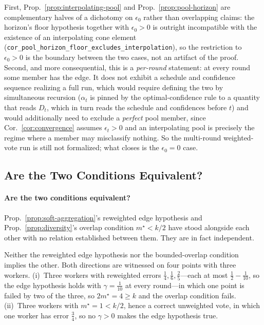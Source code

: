 First, Prop.~\ref{prop:interpolating-pool} and Prop.~\ref{prop:pool-horizon} are complementary halves of a dichotomy on $\epsilon_0$ rather than overlapping claims: the horizon's floor hypothesis together with $\epsilon_0>0$ is outright incompatible with the existence of an interpolating cone element (\texttt{cor\_pool\_horizon\_floor\_excludes\_interpolation}), so the restriction to $\epsilon_0>0$ is the boundary between the two cases, not an artifact of the proof. Second, and more consequential, this is a \emph{per-round} statement: at every round some member has the edge. It does not exhibit a schedule and confidence sequence realizing a full run, which would require defining the two by simultaneous recursion ($\alpha_t$ is pinned by the optimal-confidence rule to a quantity that reads $D_t$, which in turn reads the schedule and confidences before $t$) and would additionally need to exclude a \emph{perfect} pool member, since Cor.~\ref{cor:convergence} assumes $\epsilon_t>0$ and an interpolating pool is precisely the regime where a member may misclassify nothing. So the multi-round weighted-vote run is still not formalized; what closes is the $\epsilon_0=0$ case.


\subsection{Are the Two Conditions Equivalent?}

\paragraph{Are the two conditions equivalent?} Prop.~\ref{prop:soft-aggregation}'s reweighted edge hypothesis and Prop.~\ref{prop:diversity}'s overlap condition $m^\star{<}k/2$ have stood alongside each other with no relation established between them. They are in fact independent.

\begin{proposition}
\label{prop:conditions-independent}
Neither the reweighted edge hypothesis nor the bounded-overlap condition implies the other. Both directions are witnessed on four points with three workers. (i)~Three workers with reweighted errors $\tfrac14,\tfrac16,\tfrac25$---each at most $\tfrac12-\tfrac1{10}$, so the edge hypothesis holds with $\gamma=\tfrac1{10}$ at every round---in which one point is failed by two of the three, so $2m^\star=4\ge k$ and the overlap condition fails. (ii)~Three workers with $m^\star=1<k/2$, hence a correct unweighted vote, in which one worker has error $\tfrac34$, so no $\gamma>0$ makes the edge hypothesis true.
\end{proposition}

